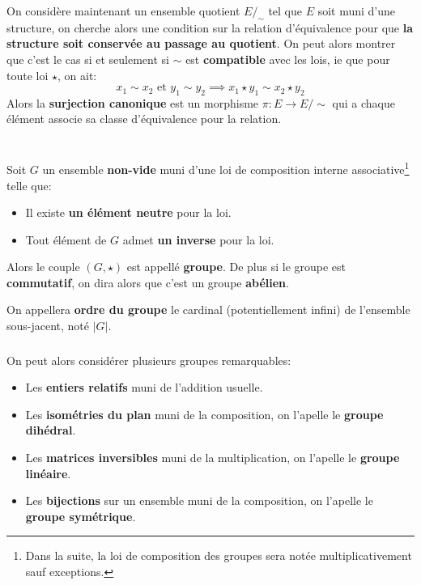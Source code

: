\subsection*{}
On considère maintenant un ensemble quotient \( E/_\sim \) tel que \( E \) soit muni d'une structure, on cherche alors une condition sur la relation d'équivalence pour que \textbf{la structure soit conservée au passage au quotient}. On peut alors montrer que c'est le cas si et seulement si \(\sim\) est \textbf{compatible} avec les lois, ie que pour toute loi \(\star\), on ait:
\[ 
   x_1 \sim x_2 \text{ et } y_1 \sim y_2 \implies x_1 \star y_1 \sim x_2 \star y_2  
\]
Alors la \textbf{surjection canonique} est un morphisme \(\pi : E \rightarrow E /\sim\) qui a chaque élément associe sa classe d'équivalence pour la relation. 
\chapter*{}

Soit \(G\) un ensemble \textbf{non-vide} muni d'une loi de composition interne associative\footnote[1]{Dans la suite, la loi de composition des groupes sera notée multiplicativement sauf exceptions.} telle que:
\begin{itemize}
   \item Il existe \textbf{un élément neutre} pour la loi.
   \item Tout élément de \(G\) admet \textbf{un inverse} pour la loi.
\end{itemize}
Alors le couple \((G, \star)\) est appellé \textbf{groupe}. De plus si le groupe est \textbf{commutatif}, on dira alors que c'est un groupe \textbf{abélien}.\<

On appellera \textbf{ordre du groupe} le cardinal (potentiellement infini) de l'ensemble sous-jacent, noté \(|G|\).
\subsection*{}
On peut alors considérer plusieurs groupes remarquables:
\begin{itemize}
   \item Les \textbf{entiers relatifs} muni de l'addition usuelle.
   \item Les \textbf{isométries du plan} muni de la composition, on l'apelle le \textbf{groupe dihédral}.  
   \item Les \textbf{matrices inversibles} muni de la multiplication, on l'apelle le \textbf{groupe linéaire}.
   \item Les \textbf{bijections} sur un ensemble muni de la composition, on l'apelle le \textbf{groupe symétrique}.
\end{itemize}
